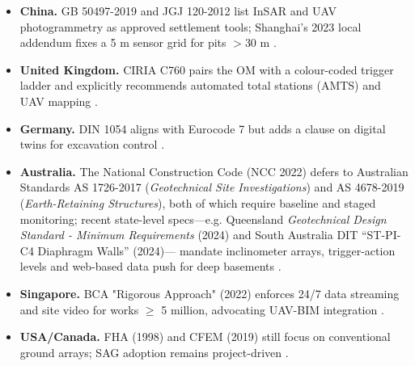\documentclass[preprint,11pt,authoryear,3p]{elsarticle}
\begin{document}
\begin{itemize}

    \item \textbf{China.} GB 50497-2019 and JGJ 120-2012 list InSAR and UAV photogrammetry as approved settlement tools; Shanghai's 2023 local addendum fixes a 5 m sensor grid for pits $>30$ m \citep{GB50497:2019,ShanghaiAddendum2023}.

    \item \textbf{United Kingdom.} CIRIA C760 pairs the OM with a colour-coded trigger ladder and explicitly recommends automated total stations (AMTS) and UAV mapping \citep{CIRIA760}.

    \item \textbf{Germany.} DIN 1054 aligns with Eurocode 7 but adds a clause on digital twins for excavation control \citep{DIN1054:2021-04}.
    
    \item \textbf{Australia.}  The National Construction Code (NCC 2022) defers to Australian Standards AS 1726-2017 (\emph{Geotechnical Site Investigations}) and AS 4678-2019 (\emph{Earth-Retaining Structures}), both of which require baseline and staged monitoring; recent state-level specs—e.g. Queensland \emph{Geotechnical Design Standard - Minimum Requirements} (2024) and South Australia DIT “ST-PI-C4 Diaphragm Walls” (2024)— mandate inclinometer arrays, trigger-action levels and web-based data push for deep basements \citep{AS1726,TMR2024,DIT2024}.

    \item \textbf{Singapore.} BCA "Rigorous Approach" (2022) enforces 24/7 data streaming and site video for works $\ge$ 5 million, advocating UAV-BIM integration \citep{BCA_Rigorous_Approach_2022}.
  
    \item \textbf{USA/Canada.} FHA (1998) and CFEM (2019) still focus on conventional ground arrays; SAG adoption remains project-driven \citep{FHWA:GEC:Series,CFEM:2023}.

\end{itemize}
\end{document}
